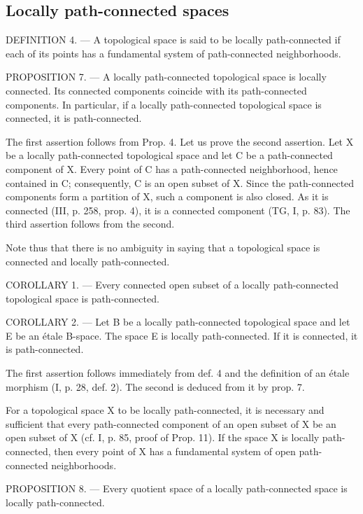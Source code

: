 \subsection{Locally path-connected spaces}

DEFINITION 4. --- A topological space is said to be locally path-connected if each of its points has a fundamental system of path-connected neighborhoods.

PROPOSITION 7. --- A locally path-connected topological space is locally connected. Its connected components coincide with its path-connected components. In particular, if a locally path-connected topological space is connected, it is path-connected.

The first assertion follows from Prop. 4. Let us prove the second assertion. Let X be a locally path-connected topological space and let C be a path-connected component of X. Every point of C has a path-connected neighborhood, hence contained in C; consequently, C is an open subset of X. Since the path-connected components form a partition of X, such a component is also closed. As it is connected (III, p. 258, prop. 4), it is a connected component (TG, I, p. 83). The third assertion follows from the second.

Note thus that there is no ambiguity in saying that a topological space is connected and locally path-connected.

COROLLARY 1. --- Every connected open subset of a locally path-connected topological space is path-connected.

COROLLARY 2. --- Let B be a locally path-connected topological space and let E be an étale B-space. The space E is locally path-connected. If it is connected, it is path-connected.

The first assertion follows immediately from def. 4 and the definition of an étale morphism (I, p. 28, def. 2). The second is deduced from it by prop. 7.

For a topological space X to be locally path-connected, it is necessary and sufficient that every path-connected component of an open subset of X be an open subset of X (cf. I, p. 85, proof of Prop. 11). If the space X is locally path-connected, then every point of X has a fundamental system of open path-connected neighborhoods.

PROPOSITION 8. --- Every quotient space of a locally path-connected space is locally path-connected.

